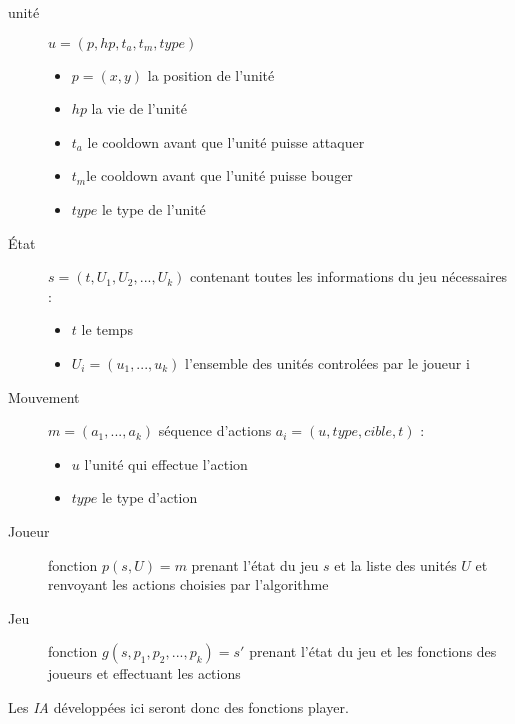 \documentclass[a4paper, 11pt]{article}
\theoremstyle{definition}
\begin{document}
\begin{description}
    \item[unité] $u = (p, hp, t_a, t_m, type)$
    \begin{itemize}
        \item $p = (x,y)$ la position de l'unité
        \item $hp$ la vie de l'unité
        \item $t_a$ le cooldown avant que l'unité puisse attaquer
        \item $t_m$le cooldown avant que l'unité puisse bouger
        \item $type$ le type de l'unité
    \end{itemize} 
    \item[État] $s = (t, U_1, U_2, ..., U_k)$ contenant toutes les informations du jeu nécessaires :
    \begin{itemize}
        \item $t$ le temps
        \item $U_i = (u_1,...,u_k)$ l'ensemble des unités controlées par le joueur i
    \end{itemize} 
    \item[Mouvement] $m= ( a_1,..., a_k )$ séquence d'actions $a_i = (u, type, cible, t)$ :
    \begin{itemize}
        \item $u$ l'unité qui effectue l'action
        \item $type$ le type d'action
    \end{itemize}
    \item[Joueur] fonction $p(s,U) = m$ prenant l'état du jeu $s$ et la liste des unités $U$
    et renvoyant les actions choisies par l'algorithme
    \item[Jeu] fonction $g(s, p_1, p_2, ..., p_k) = s'$ prenant l'état du jeu et
    les fonctions des joueurs et effectuant les actions
\end{description}

Les \emph{IA} développées ici seront donc des fonctions player.
\end{document}
